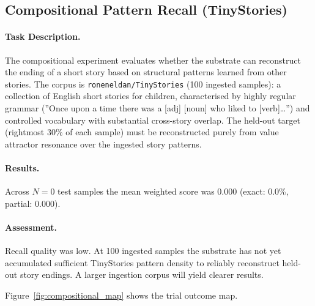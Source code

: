 \subsection{Compositional Pattern Recall (TinyStories)}
\label{sec:compositional}

\paragraph{Task Description.}
The compositional experiment evaluates whether the substrate can reconstruct
the ending of a short story based on structural patterns learned from other
stories.  The corpus is \texttt{roneneldan/TinyStories} (100 ingested samples):
a collection of English short stories for children, characterised by highly
regular grammar (''Once upon a time there was a [adj] [noun] who liked to
[verb]\ldots'') and controlled vocabulary with substantial cross-story overlap.
The held-out target (rightmost 30\% of each sample) must be reconstructed
purely from value attractor resonance over the ingested story patterns.

\paragraph{Results.}
Across $N = 0$ test samples the mean weighted score was 0.000
(exact: 0.0\%, partial: 0.000).

\paragraph{Assessment.}
Recall quality was low.  At 100 ingested samples the substrate has not yet
accumulated sufficient TinyStories pattern density to reliably reconstruct
held-out story endings.  A larger ingestion corpus will yield clearer results.

Figure~\ref{fig:compositional_map} shows the trial outcome map.
